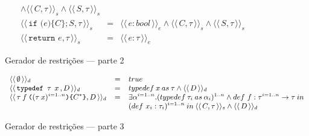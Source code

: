 \documentclass[a4paper,8pt]{article}
\newcommand{\constre}[1]{\ensuremath{\langle\langle\,#1\,\rangle\rangle_{e}}}
\newcommand{\constrc}[1]{\ensuremath{\langle\langle\,#1\,\rangle\rangle_{s}}}
\newcommand{\constrd}[1]{\ensuremath{\langle\langle\,#1\,\rangle\rangle_{d}}}
\begin{document}
\begin{figure}[h]
\[{\begin{array}{lcl}
                                                     \land
                                                     \constrc{C
                                                            , \tau}
                                                                \land \constrc{S,\tau}\\
             \constrc{\texttt{if (} e \texttt{)\{} C
             \texttt{\}} ; S , \tau} & = & \constre{e : bool}
                                                     \land
                                                     \constrc{C
                                       , \tau} \land \constrc{S,\tau}\\
             \constrc{\texttt{return }e, \tau} & = & \constre{e : \tau}
           \end{array}}
       \]
       \centering
       \caption{Gerador de restrições --- parte 2}
       \label{figgen2}
     \end{figure}

     \begin{figure}[h]
       \[
         \small{
           \begin{array}{lcl}
               \constrd{\emptyset} & = & true \\
               \constrd{\texttt{typedef }\tau\:\:x\,,D} & = &
                                                             typedef\:x
                                                             \:as\:\tau
                                                             \land \constrd{D}\\
               \constrd{\tau\:f\:\texttt{(}(\tau\:x)^{i=1..n}\texttt{)}
             \texttt{\{}C^*\texttt{\}} , D} & = & \exists \alpha^{i =
                                                  1..n}. (typedef\:\tau_i\:as\:\alpha_i)^{1..n}
                                                  \land def\,\,f :
                                                       \tau^{i =
                                                       1.. n}\to \tau
                                                       \:in\\
                           & &
                                                       (def\,\,x_i :
                                                       \tau_i)^{i
                                                       = 1..n}\: in\:
                                                       \constrc{C,\tau}
                                                       \land \constrd{D}
           \end{array}
         }
       \]
       \centering
       \caption{Gerador de restrições --- parte 3}
        \label{figgen3}
     \end{figure}
     
\end{document}
